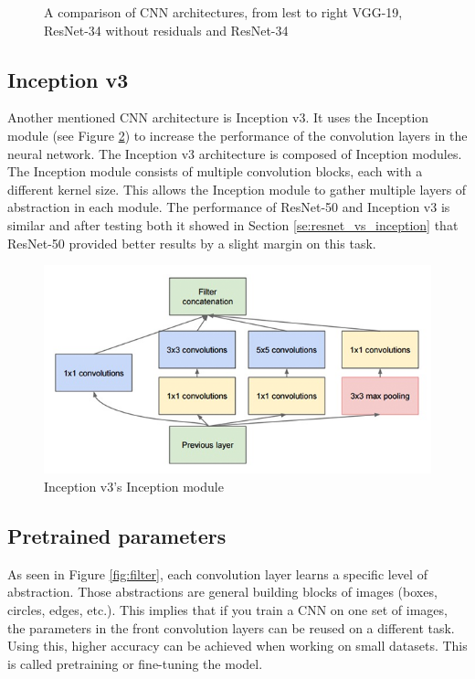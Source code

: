 \documentclass[times, utf8, diplomski]{fer}
\begin{document}
\begin{figure}
  \centering
  \caption{A comparison of CNN architectures, from lest to right VGG-19, ResNet-34 without residuals and ResNet-34}
  \label{fig:vgg_resnet_comparison}
\end{figure}

\subsection{Inception v3} 
\label{se:inceptionv3_architecture}

Another mentioned CNN architecture is Inception v3. It uses the Inception module (see Figure \ref{fig:inception_module}) to increase the performance of the convolution layers in the neural network. The Inception v3 architecture is composed of Inception modules. The Inception module consists of multiple convolution blocks, each with a different kernel size. This allows the Inception module to gather multiple layers of abstraction in each module. The performance of ResNet-50 and Inception v3 is similar and after testing both it showed in Section \ref{se:resnet_vs_inception} that  ResNet-50 provided better results by a slight margin on this task.

\begin{figure}
  \includegraphics[scale=0.7]{figures/inception_module.png}
  \centering
  \caption{Inception v3's Inception module}
  \label{fig:inception_module}
\end{figure}


\subsection{Pretrained parameters}
\label{se:pretrained_parameters}
As seen in Figure \ref{fig:filter}, each convolution layer learns a specific level of abstraction. Those abstractions are general building blocks of images (boxes, circles, edges, etc.). This implies that if you train a CNN on one set of images, the parameters in the front convolution layers can be reused on a different task. Using this, higher accuracy can be achieved when working on small datasets. This is called pretraining or fine-tuning the model.
\end{document}
